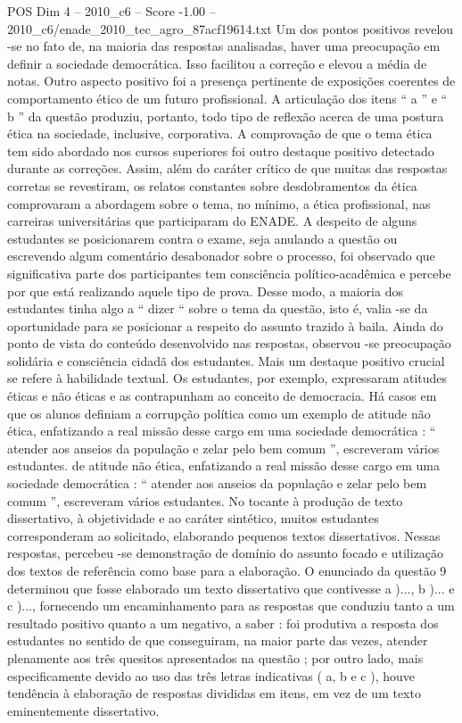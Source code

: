 \begin{textsample}{POS Dim 4 – 2010\_c6 – Score -1.00 – 2010\_c6/enade\_2010\_tec\_agro\_87acf19614.txt}
Um dos pontos positivos revelou -se no fato de, na maioria das respostas analisadas, haver uma preocupação em definir a sociedade democrática.
Isso facilitou a correção e elevou a média de notas.
Outro aspecto positivo foi a presença pertinente de exposições coerentes de comportamento ético de um futuro profissional.
A articulação dos itens “ a ” e “ b ” da questão produziu, portanto, todo tipo de reflexão acerca de uma postura ética na sociedade, inclusive, corporativa.
A comprovação de que o tema ética tem sido abordado nos cursos superiores foi outro destaque positivo detectado durante as correções.
Assim, além do caráter crítico de que muitas das respostas corretas se revestiram, os relatos constantes sobre desdobramentos da ética comprovaram a abordagem sobre o tema, no mínimo, a ética profissional, nas carreiras universitárias que participaram do ENADE.
A despeito de alguns estudantes se posicionarem contra o exame, seja anulando a questão ou escrevendo algum comentário desabonador sobre o processo, foi observado que significativa parte dos participantes tem consciência político-acadêmica e percebe por que está realizando aquele tipo de prova.
Desse modo, a maioria dos estudantes tinha algo a “ dizer “ sobre o tema da questão, isto é, valia -se da oportunidade para se posicionar a respeito do assunto trazido à baila.
Ainda do ponto de vista do conteúdo desenvolvido nas respostas, observou -se preocupação solidária e consciência cidadã dos estudantes.
Mais um destaque positivo crucial se refere à habilidade textual.
Os estudantes, por exemplo, expressaram atitudes éticas e não éticas e as contrapunham ao conceito de democracia.
Há casos em que os alunos definiam a corrupção política como um exemplo de atitude não ética, enfatizando a real missão desse cargo em uma sociedade democrática : “ atender aos anseios da população e zelar pelo bem comum ”, escreveram vários estudantes. de atitude não ética, enfatizando a real missão desse cargo em uma sociedade democrática : “ atender aos anseios da população e zelar pelo bem comum ”, escreveram vários estudantes.
No tocante à produção de texto dissertativo, à objetividade e ao caráter sintético, muitos estudantes corresponderam ao solicitado, elaborando pequenos textos dissertativos.
Nessas respostas, percebeu -se demonstração de domínio do assunto focado e utilização dos textos de referência como base para a elaboração.
O enunciado da questão 9 determinou que fosse elaborado um texto dissertativo que contivesse a )..., b )... e c )..., fornecendo um encaminhamento para as respostas que conduziu tanto a um resultado positivo quanto a um negativo, a saber : foi produtiva a resposta dos estudantes no sentido de que conseguiram, na maior parte das vezes, atender plenamente aos três quesitos apresentados na questão ; por outro lado, mais especificamente devido ao uso das três letras indicativas ( a, b e c ), houve tendência à elaboração de respostas divididas em itens, em vez de um texto eminentemente dissertativo.

\end{textsample}
